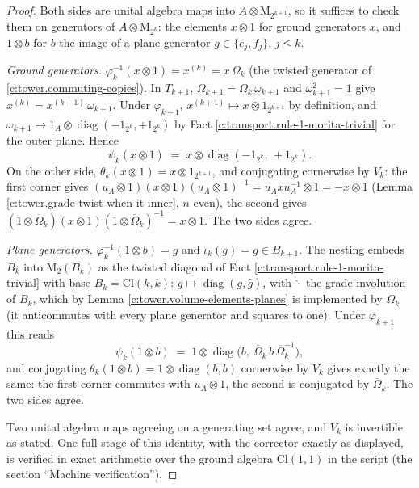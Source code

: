 \documentclass[11pt]{article}
\theoremstyle{definition}
\theoremstyle{plain}
\providecommand{\Cl}{}\renewcommand{\Cl}{\mathrm{Cl}}
\providecommand{\Mat}{}\renewcommand{\Mat}{\mathrm{M}}
\begin{document}
\begin{proof}
Both sides are unital algebra maps into $A \otimes \Mat_{2^{k+1}}$, so it suffices to check them on generators of $A \otimes \Mat_{2^k}$: the elements $x \otimes 1$ for ground generators $x$, and $1 \otimes b$ for $b$ the image of a plane generator $g \in \{e_j, f_j\}$, $j \leq k$.

\emph{Ground generators.} $\varphi_k^{-1}(x \otimes 1) = x^{(k)} = x\,\Omega_k$ (the twisted generator of \ref{c:tower.commuting-copies}). In $T_{k+1}$, $\Omega_{k+1} = \Omega_k\, \omega_{k+1}$ and $\omega_{k+1}^2 = 1$ give $x^{(k)} = x^{(k+1)}\, \omega_{k+1}$. Under $\varphi_{k+1}$, $x^{(k+1)} \mapsto x \otimes 1_{2^{k+1}}$ by definition, and $\omega_{k+1} \mapsto 1_A \otimes \operatorname{diag}(-1_{2^k}, +1_{2^k})$ by Fact \ref{c:transport.rule-1-morita-trivial} for the outer plane. Hence
\[
\psi_k(x \otimes 1) \;=\; x \otimes \operatorname{diag}(-1_{2^k},\, +1_{2^k}).
\]
On the other side, $\theta_k(x \otimes 1) = x \otimes 1_{2^{k+1}}$, and conjugating cornerwise by $V_k$: the first corner gives $(u_A \otimes 1)(x \otimes 1)(u_A \otimes 1)^{-1} = u_A x u_A^{-1} \otimes 1 = -x \otimes 1$ (Lemma \ref{c:tower.grade-twist-when-it-inner}, $n$ even), the second gives $(1 \otimes \overline\Omega_k)(x \otimes 1)(1 \otimes \overline\Omega_k)^{-1} = x \otimes 1$. The two sides agree.

\emph{Plane generators.} $\varphi_k^{-1}(1 \otimes b) = g$ and $\iota_k(g) = g \in B_{k+1}$. The nesting embeds $B_k$ into $\Mat_2(B_k)$ as the twisted diagonal of Fact \ref{c:transport.rule-1-morita-trivial} with base $B_k = \Cl(k,k)$: $g \mapsto \operatorname{diag}(g, \hat g)$, with $\hat{\cdot}$ the grade involution of $B_k$, which by Lemma \ref{c:tower.volume-elements-planes} is implemented by $\Omega_k$ (it anticommutes with every plane generator and squares to one). Under $\varphi_{k+1}$ this reads
\[
\psi_k(1 \otimes b) \;=\; 1 \otimes \operatorname{diag}\bigl(b,\ \overline\Omega_k\, b\, \overline\Omega_k^{-1}\bigr),
\]
and conjugating $\theta_k(1 \otimes b) = 1 \otimes \operatorname{diag}(b, b)$ cornerwise by $V_k$ gives exactly the same: the first corner commutes with $u_A \otimes 1$, the second is conjugated by $\overline\Omega_k$. The two sides agree.

Two unital algebra maps agreeing on a generating set agree, and $V_k$ is invertible as stated. One full stage of this identity, with the corrector exactly as displayed, is verified in exact arithmetic over the ground algebra $\Cl(1,1)$ in the script (the section ``Machine verification'').

\end{proof}
\end{document}
